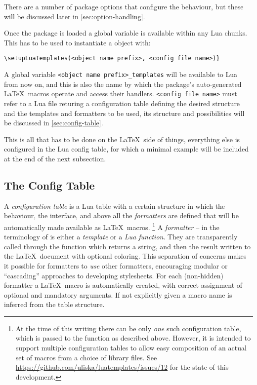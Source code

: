 \documentclass{scrartcl}
\begin{document}
\noindent There are a number of package options that configure the behaviour,
but these will be discussed later in \vref{sec:option-handling}.

Once the package is loaded a global variable  is
available within any Lua chunks. This has to be used to instantiate a
 object with:

\begin{verbatim}
\setupLuaTemplates(<object name prefix>, <config file name>)}
\end{verbatim}

A global variable \texttt{<object name prefix>\_templates} will be available to
Lua from now on, and this is also the name by which the package's auto-generated
\LaTeX\ macros operate and access their handlers.   \texttt{<config file name>}
must refer to a Lua file returing a configuration table defining the desired
structure and the templates and formatters to be used, its structure and
possibilities will be discussed in \vref{sec:config-table}.

This is all that has to be done on the \LaTeX\ side of things, everything else
is configured in the Lua config table, for which a minimal example will be
included at the end of the next subsection.

\subsection{The Config Table}
\label{sec:config-table}

A \emph{configuration table} is a Lua table with a certain structure in which
the behaviour, the interface, and above all the \emph{formatters} are defined
that will be automatically made available as \LaTeX\ macros.%
\footnote{At the time of this writing there can be only \emph{one} such
configuration table, which is passed to the  function
as described above.  However, it is intended to support multiple configuration
tables to allow easy composition of an actual set of macros from a choice of
library files.  See \url{https://github.com/uliska/luatemplates/issues/12}
for the state of this development.} %
A \emph{formatter} -- in the terminology of  is either a
\emph{template} or a \emph{Lua function}.  They are transparently called through
the function  which returns a string, and then the
result written to the \LaTeX\ document with optional coloring.  This separation
of concerns makes it possible for formatters to \emph{use} other formatters,
encouraging modular or “cascading” approaches to developing stylesheets. For
each (non-hidden) formatter a \LaTeX\ macro is automatically created, with
correct assignment of optional and mandatory arguments.  If not explicitly given
a macro name is inferred from the table structure.
\end{document}
